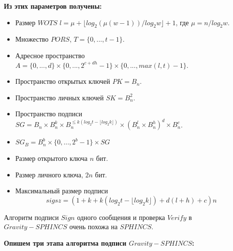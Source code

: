 \documentclass[a4paper, 14pt]{extarticle}
\begin{document}
\newpage

\textbf{Из этих параметров получены:}

\begin{itemize}
    \item Размер $WOTS$ $l = \mu + \lfloor log_{2}(\mu(w - 1))/log_{2}w \rfloor + 1$, где $\mu = n/log_{2}w$.
    \item Множество $PORS$, $T = \{0, ..., t - 1\}$.
    \item Адресное пространство $A = \{0, ..., d\} \times \{0, ..., 2^{c + dh} - 1\} \times \{0, ..., max(l,t) - 1\}$.
    \item Пространство открытых ключей $PK = B_{n}$.
    \item Пространство личных ключей $SK = B^{2}_{n}$.
    \item Пространство подписи $SG = B_{n} \times B^{k}_{n} \times B^{\leq k(log_{2}t - \lfloor log_{2}k \rfloor)}_{n} \times (B^{l}_{n} \times B^{h}_{n})^{d} \times B^{c}_{n}$.
    \item $SG_{B} = B^{b}_{n} \times \{0, ..., 2^{b} - 1\} \times SG$
    \item Размер открытого ключа $n$ бит.
    \item Размер личного ключа, $2n$ бит.
    \item Максимальный размер подписи
    \[sigsz = (1 + k +k(log_{2}t - \lfloor log_{2}k \rfloor) + d(l + h) + c)n\]
\end{itemize}

Алгоритм подписи $Sign$ одного сообщения и проверка $Verify$ в $Gravity-SPHINCS$ очень похожа на $SPHINCS$.
\newline

\textbf{Опишем три этапа алгоритма подписи $Gravity-SPHINCS$:}
\end{document}

